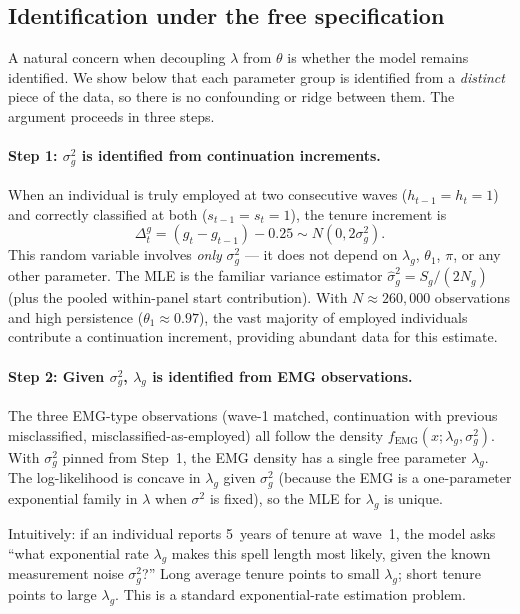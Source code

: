 \documentclass[12pt]{article}
\begin{document}
\newpage

\subsection{Identification under the free specification}
\label{sec:identification}

A natural concern when decoupling \(\lambda\) from \(\theta\) is whether the model remains identified. We show below that each parameter group is identified from a \emph{distinct} piece of the data, so there is no confounding or ridge between them. The argument proceeds in three steps.

\paragraph{Step 1: \(\sigma_g^2\) is identified from continuation increments.}
When an individual is truly employed at two consecutive waves (\(h_{t-1}=h_t=1\)) and correctly classified at both (\(s_{t-1}=s_t=1\)), the tenure increment is
\[
\Delta^g_t = (g_t - g_{t-1}) - 0.25 \sim N(0, 2\sigma_g^2).
\]
This random variable involves \emph{only} \(\sigma_g^2\) --- it does not depend on \(\lambda_g\), \(\theta_1\), \(\pi\), or any other parameter. The MLE is the familiar variance estimator \(\hat{\sigma}_g^2 = S_g / (2N_g)\) (plus the pooled within-panel start contribution). With \(N\approx 260{,}000\) observations and high persistence (\(\theta_1\approx 0.97\)), the vast majority of employed individuals contribute a continuation increment, providing abundant data for this estimate.

\paragraph{Step 2: Given \(\sigma_g^2\), \(\lambda_g\) is identified from EMG observations.}
The three EMG-type observations (wave-1 matched, continuation with previous misclassified, misclassified-as-employed) all follow the density \(f_{\mathrm{EMG}}(x; \lambda_g, \sigma_g^2)\). With \(\sigma_g^2\) pinned from Step~1, the EMG density has a single free parameter \(\lambda_g\). The log-likelihood is concave in \(\lambda_g\) given \(\sigma_g^2\) (because the EMG is a one-parameter exponential family in \(\lambda\) when \(\sigma^2\) is fixed), so the MLE for \(\lambda_g\) is unique.

Intuitively: if an individual reports 5~years of tenure at wave~1, the model asks ``what exponential rate \(\lambda_g\) makes this spell length most likely, given the known measurement noise \(\sigma_g^2\)?'' Long average tenure points to small \(\lambda_g\); short tenure points to large \(\lambda_g\). This is a standard exponential-rate estimation problem.
\end{document}
